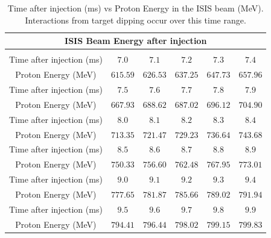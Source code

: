 \documentclass[a4paper,11pt]{article}
\begin{document}
\begin{table}
\centering
\label{Table:Inj}
\begin{tabular}{ c c c c c c }
\hline \multicolumn{6}{c}{ISIS Beam Energy after injection}\\
\hline \vspace{-4.5mm} \\
Time after injection (ms) & $7.0$ & $7.1$ & $7.2$ & $7.3$ & $7.4$ \\
Proton Energy (MeV) & $615.59$ & $626.53$ & $637.25$ & $647.73$ & $657.96$ \\ \hline 
Time after injection (ms) & $7.5$ & $7.6$ & $7.7$ & $7.8$ & $7.9$ \\ 
Proton Energy (MeV) & $667.93$ & $688.62$ & $687.02$ & $696.12$ & $704.90$ \\ \hline
Time after injection (ms) & $8.0$ & $8.1$ & $8.2$ & $8.3$ & $8.4$ \\ 
Proton Energy (MeV) & $713.35$ & $721.47$ & $729.23$ & $736.64$ & $743.68$ \\ \hline
Time after injection (ms) & $8.5$ & $8.6$ & $8.7$ & $8.8$ & $8.9$ \\
Proton Energy (MeV) & $750.33$ & $756.60$ & $762.48$ & $767.95$ & $773.01$ \\ \hline
Time after injection (ms) & $9.0$ & $9.1$ & $9.2$ & $9.3$ & $9.4$ \\ 
Proton Energy (MeV) & $777.65$ & $781.87$ & $785.66$ & $789.02$ & $791.94$ \\ \hline
Time after injection (ms) & $9.5$ & $9.6$ & $9.7$ & $9.8$ & $9.9$ \\ 
Proton Energy (MeV) & $794.41$ & $796.44$ & $798.02$ & $799.15$ & $799.83$ \\

\hline
\end{tabular}
\caption{Time after injection (ms) vs Proton Energy in the ISIS beam (MeV). Interactions from target dipping occur over this time range.}
\end{table}
\end{document}
